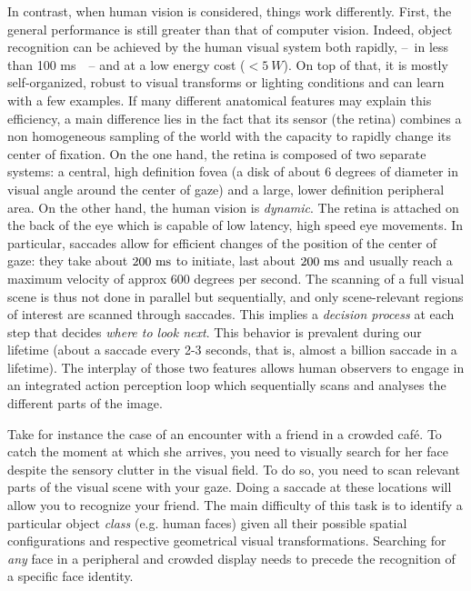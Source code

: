 In contrast, when human vision is considered, things work differently. First, the  general performance is still greater than that of computer vision.
Indeed, object recognition can be achieved by the human visual system both rapidly, --~in less than 100 ms~\citep{Kirchner06}~-- and at a low energy cost ($<5~W$). 
On top of that, it is mostly self-organized, robust to visual transforms or lighting conditions and can learn with a few examples. If many different anatomical features may explain this efficiency, a main difference lies in the fact that its sensor (the retina) combines a non homogeneous sampling of the world with the capacity to rapidly change its center of fixation. On the one hand, the retina is composed of two separate systems: a central, high definition fovea (a disk of about 6 degrees of diameter in visual angle around the center of gaze) and a large, lower definition peripheral area. 
On the other hand, the human vision is \emph{dynamic}. The retina is attached on the back of the eye which is capable of low latency, high speed eye movements. In particular, saccades allow for efficient changes of the position of the center of gaze: they take about $200~\si{\milli\second}$ to initiate, last about $200~\si{\milli\second}$ and usually reach a maximum velocity of approx 600 degrees per second. The scanning of a full visual scene is thus  not done in parallel but sequentially, and only scene-relevant regions of interest are scanned through saccades. This implies a \emph{decision process} at each step that decides \emph{where to look next}. This behavior is prevalent during our lifetime (about a saccade every 2-3 seconds, that is, almost a billion saccade in a lifetime). The interplay of those two features allows human observers to engage in an integrated action perception loop which sequentially scans and analyses the different parts of the image.


Take for instance the case of an encounter with a friend in a crowded café. To catch the moment at which she arrives, you need to visually search for her face despite the sensory clutter in the visual field. To do so, you need to scan relevant parts of the visual scene with your gaze. Doing a saccade at these locations will allow you to recognize your friend. The main difficulty of this task is to identify a particular object \emph{class} (e.g. human faces) given all their possible spatial configurations and respective geometrical visual transformations. Searching for \emph{any} face in a peripheral and crowded display needs to precede the recognition of a specific face identity. 


